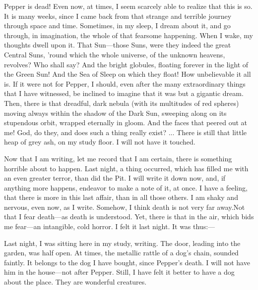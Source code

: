 
\clearpage
\label{ch:18}

\begin{ChapterStart}
\null\null
{}
\end{ChapterStart}

Pepper is dead! Even now, at times, I seem scarcely able to realize that this is so. It is many weeks, since I came back from that strange and terrible journey through space and time. Sometimes, in my sleep, I dream about it, and go through, in imagination, the whole of that fearsome happening. When I wake, my thoughts dwell upon it. That Sun---those Suns, were they indeed the great Central Suns, ’round which the whole universe, of the unknown heavens, revolves? Who shall say? And the bright globules, floating forever in the light of the Green Sun! And the Sea of Sleep on which they float! How unbelievable it all is. If it were not for Pepper, I should, even after the many extraordinary things that I have witnessed, be inclined to imagine that it was but a gigantic dream. Then, there is that dreadful, dark nebula (with its multitudes of red spheres) moving always within the shadow of the Dark Sun, sweeping along on its stupendous orbit, wrapped eternally in gloom. And the faces that peered out at me! God, do they, and does such a thing really exist? ... There is still that little heap of grey ash, on my study floor. I will not have it touched.

Now that I am writing, let me record that I am certain, there is something horrible about to happen. Last night, a thing occurred, which has filled me with an even greater terror, than did the Pit. I will write it down now, and, if anything more happens, endeavor to make a note of it, at once. I have a feeling, that there is more in this last affair, than in all those others. I am shaky and nervous, even now, as I write. Somehow, I think death is not very far away.\linebreak Not that I fear death---as death is understood. Yet, there is that in the air, which bids me fear---an intangible, cold horror. I felt it last night. It was thus:---

Last night, I was sitting here in my study, writing. The door, leading into the garden, was half open. At times, the metallic rattle of a dog’s chain, sounded faintly. It belongs to the dog I have bought, since Pepper’s death. I will not have him in the house---not after Pepper. Still, I have felt it better to have a dog about the place. They are wonderful creatures.


